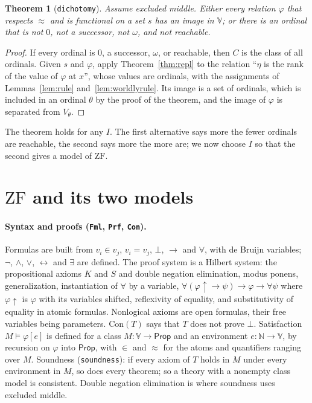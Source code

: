 \documentclass[10pt]{article}
\newtheorem{theorem}{Theorem}[section]
\theoremstyle{definition}
\theoremstyle{remark}
\newcommand{\N}{\mathbb{N}}
\newcommand{\Prop}{\mathsf{Prop}}
\newcommand{\ZF}{\mathrm{ZF}}
\newcommand{\Con}{\mathrm{Con}}
\newcommand{\V}{\mathbb{V}}
\newcommand{\lean}[1]{\texttt{#1}}
\begin{document}
\begin{theorem}[\lean{dichotomy}]\label{thm:dich}
Assume excluded middle. Either every relation $\varphi$ that respects $\approx$ and
is functional on a set $s$ has an image in $\V$; or there is an ordinal
that is not $0$, not a successor, not $\omega$, and not reachable.
\end{theorem}
\begin{proof}
If every ordinal is $0$, a successor, $\omega$, or reachable, then $C$ is
the class of all ordinals. Given $s$ and $\varphi$, apply
Theorem~\ref{thm:repl} to the relation ``$\eta$ is the rank of the value of
$\varphi$ at $x$'', whose values are ordinals, with the assignments of
Lemmas~\ref{lem:rule} and~\ref{lem:worldlyrule}. Its image is a set of
ordinals, which is included in an ordinal $\theta$ by the proof of the
theorem, and the image of $\varphi$ is separated from $V_\theta$.
\end{proof}

The theorem holds for any $I$. The first alternative says more the
fewer ordinals are reachable, the second says more the more are; we now
choose $I$ so that the second gives a model of $\ZF$.

\section{$\ZF$ and its two models}\label{sec:zf}

\paragraph{Syntax and proofs (\lean{Fml}, \lean{Prf}, \lean{Con}).}
Formulas are built from $v_i\in v_j$, $v_i=v_j$, $\bot$, $\to$ and $\forall$,
with de Bruijn variables; $\neg$, $\wedge$, $\vee$, $\leftrightarrow$ and $\exists$ are
defined. The proof system is a Hilbert system: the propositional axioms
$K$ and $S$ and double negation elimination, modus ponens,
generalization, instantiation of $\forall$ by a variable,
$\forall(\varphi{\uparrow}\to\psi)\to\varphi\to\forall\psi$ where $\varphi{\uparrow}$ is $\varphi$ with its
variables shifted, reflexivity of equality, and substitutivity of
equality in atomic formulas. Nonlogical axioms are open formulas, their
free variables being parameters. $\Con(T)$ says that $T$ does not prove
$\bot$. Satisfaction $M\models\varphi[e]$ is defined for a class $M:\V\to\Prop$
and an environment $e:\N\to\V$, by recursion on $\varphi$ into $\Prop$, with
$\in$ and $\approx$ for the atoms and quantifiers ranging over $M$. Soundness
(\lean{soundness}): if every axiom of $T$ holds in $M$ under every
environment in $M$, so does every theorem; so a theory with a nonempty
class model is consistent. Double negation elimination is where
soundness uses excluded middle.
\end{document}
